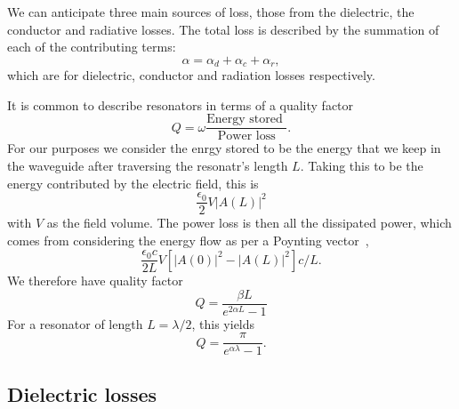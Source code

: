 \documentclass[a4paper]{article}
\begin{document}
We can anticipate three main sources of loss, those from the dielectric, the
conductor and radiative losses. \cite{Simons2004} The total loss is described
by the summation of each of the contributing terms:
\begin{equation}
  \alpha = \alpha_d + \alpha_c + \alpha_r,
\end{equation}
which are for dielectric, conductor and radiation losses respectively.

It is common to describe resonators in terms of a quality
factor~\cite{1125652}
\begin{equation}
  Q = \omega \frac{\text{Energy stored }}{\text{Power loss}}.
\end{equation}
For our purposes we consider the enrgy stored to be the energy that we keep in
the waveguide after traversing the resonatr's length $L$. Taking this to be the
energy contributed by the electric field, this is
\begin{equation}
  \frac{\epsilon_0}{2} V \lvert A(L) \rvert^2
\end{equation}
with $V$ as the field volume.  The power loss is then all the dissipated power,
which comes from considering the energy flow as per a Poynting
vector~\cite{Jackson1975},
\begin{equation}
  \frac{\epsilon_0 c}{2L}V \left[ \lvert A(0) \rvert^2 - \lvert A(L) \rvert^2
  \right] c/L.
\end{equation}
We therefore have quality factor
\begin{equation}
  Q = \frac{\beta L}{e^{2\alpha L} -1}
\end{equation}
For a resonator of length $L = \lambda/2$, this yields
\begin{equation}
  Q = \frac{\pi}{e^{\alpha \lambda} - 1}.
\end{equation}

\subsection{Dielectric losses}
\end{document}

